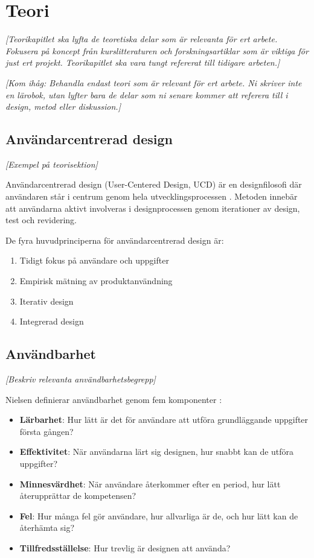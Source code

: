 \section{Teori}

\textit{[Teorikapitlet ska lyfta de teoretiska delar som är relevanta för ert arbete. Fokusera på koncept från kurslitteraturen och forskningsartiklar som är viktiga för just ert projekt. Teorikapitlet ska vara tungt refererat till tidigare arbeten.]}

\textit{[Kom ihåg: Behandla endast teori som är relevant för ert arbete. Ni skriver inte en lärobok, utan lyfter bara de delar som ni senare kommer att referera till i design, metod eller diskussion.]}


\subsection{Användarcentrerad design}

\textit{[Exempel på teorisektion]}

Användarcentrerad design (User-Centered Design, UCD) är en designfilosofi där användaren står i centrum genom hela utvecklingsprocessen \cite{sharp2019}. Metoden innebär att användarna aktivt involveras i designprocessen genom iterationer av design, test och revidering.

De fyra huvudprinciperna för användarcentrerad design är:
\begin{enumerate}
    \item Tidigt fokus på användare och uppgifter
    \item Empirisk mätning av produktanvändning
    \item Iterativ design
    \item Integrerad design
\end{enumerate}


\subsection{Användbarhet}

\textit{[Beskriv relevanta användbarhetsbegrepp]}

Nielsen definierar användbarhet genom fem komponenter \cite{nielsen2012}:
\begin{itemize}
    \item \textbf{Lärbarhet}: Hur lätt är det för användare att utföra grundläggande uppgifter första gången?
    \item \textbf{Effektivitet}: När användarna lärt sig designen, hur snabbt kan de utföra uppgifter?
    \item \textbf{Minnesvärdhet}: När användare återkommer efter en period, hur lätt återupprättar de kompetensen?
    \item \textbf{Fel}: Hur många fel gör användare, hur allvarliga är de, och hur lätt kan de återhämta sig?
    \item \textbf{Tillfredsställelse}: Hur trevlig är designen att använda?
\end{itemize}


